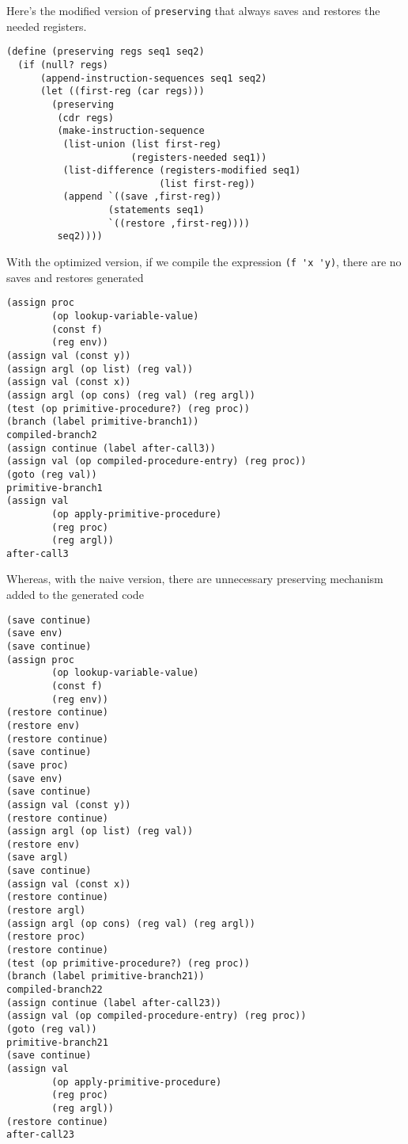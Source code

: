 \documentclass[a4paper,12pt]{article}
\begin{document}
Here's the modified version of \lstinline!preserving! that always
saves and restores the needed registers.
\begin{lstlisting}
(define (preserving regs seq1 seq2)
  (if (null? regs)
      (append-instruction-sequences seq1 seq2)
      (let ((first-reg (car regs)))
        (preserving
         (cdr regs)
         (make-instruction-sequence
          (list-union (list first-reg)
                      (registers-needed seq1))
          (list-difference (registers-modified seq1)
                           (list first-reg))
          (append `((save ,first-reg))
                  (statements seq1)
                  `((restore ,first-reg))))
         seq2))))
\end{lstlisting}

With the optimized version, if we compile the expression
\lstinline!(f 'x 'y)!, there are no saves and restores generated

\begin{lstlisting}
(assign proc
        (op lookup-variable-value)
        (const f)
        (reg env))
(assign val (const y))
(assign argl (op list) (reg val))
(assign val (const x))
(assign argl (op cons) (reg val) (reg argl))
(test (op primitive-procedure?) (reg proc))
(branch (label primitive-branch1))
compiled-branch2
(assign continue (label after-call3))
(assign val (op compiled-procedure-entry) (reg proc))
(goto (reg val))
primitive-branch1
(assign val
        (op apply-primitive-procedure)
        (reg proc)
        (reg argl))
after-call3
\end{lstlisting}

Whereas, with the naive version, there are unnecessary preserving
mechanism added to the generated code

\begin{lstlisting}
(save continue)
(save env)
(save continue)
(assign proc
        (op lookup-variable-value)
        (const f)
        (reg env))
(restore continue)
(restore env)
(restore continue)
(save continue)
(save proc)
(save env)
(save continue)
(assign val (const y))
(restore continue)
(assign argl (op list) (reg val))
(restore env)
(save argl)
(save continue)
(assign val (const x))
(restore continue)
(restore argl)
(assign argl (op cons) (reg val) (reg argl))
(restore proc)
(restore continue)
(test (op primitive-procedure?) (reg proc))
(branch (label primitive-branch21))
compiled-branch22
(assign continue (label after-call23))
(assign val (op compiled-procedure-entry) (reg proc))
(goto (reg val))
primitive-branch21
(save continue)
(assign val
        (op apply-primitive-procedure)
        (reg proc)
        (reg argl))
(restore continue)
after-call23
\end{lstlisting}
\end{document}
